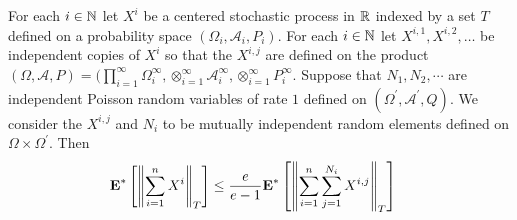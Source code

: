 \begin{lem}\label{LeCamPoissonization}For each $i \in \mathbb{N}$ let $X^i$ be a centered stochastic process in $\mathbb{R}$ indexed by a set $T$ defined on a probability space $(\Omega_i, \mathcal{A}_i, P_i)$.  For each $i \in \mathbb{N}$ let $X^{i,1}, X^{i,2}, \dotsc$ be independent copies of $X^i$ so that the $X^{i,j}$ are defined on the product $(\Omega, \mathcal{A}, P) = (\prod_{i=1}^\infty \Omega_i^\infty, \otimes_{i=1}^\infty \mathcal{A}_i^{\infty}, \otimes_{i=1}^\infty P_i^\infty$.  Suppose that $N_1, N_2, \dotsb$ are independent Poisson random variables of rate $1$ defined on $(\Omega^\prime, \mathcal{A}^\prime, Q)$.  We consider the $X^{i,j}$ and $N_i$ to be mutually independent random elements defined on $\Omega \times \Omega^\prime$.  Then
\begin{align*}
\textbf{E}^*\left[\left \lVert \sum_{i=1}^n X^i \right \rVert_T\right] &\leq \frac{e}{e-1} \textbf{E}^*\left[\left \lVert \sum_{i=1}^n \sum_{j=1}^{N_i} X^{i,j} \right \rVert_T\right]
\end{align*}
\end{lem}
